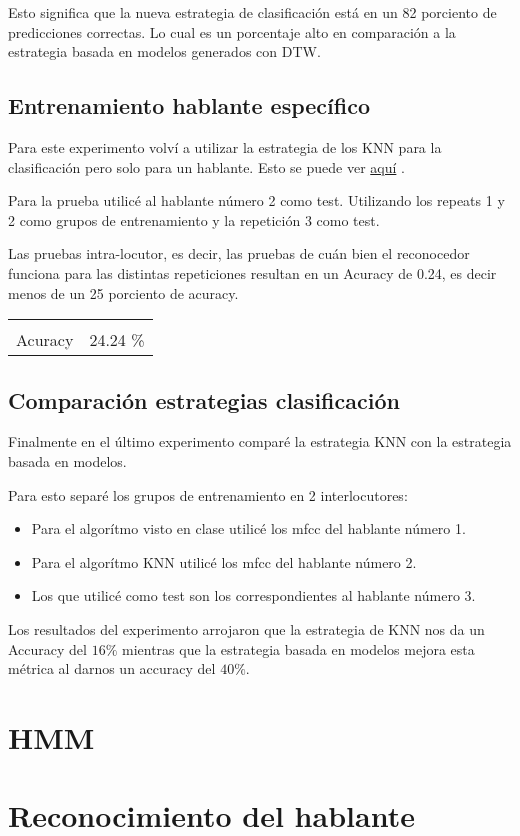 \documentclass[a4paper,8pt]{article}
\begin{document}
Esto significa que la nueva estrategia de clasificaci\'on est\'a en un 82 porciento de predicciones correctas. Lo cual es un porcentaje alto en comparaci\'on a la estrategia basada en modelos generados con DTW.


\subsection{Entrenamiento hablante espec\'ifico}

Para este experimento volv\'i a utilizar la estrategia de los KNN para la clasificaci\'on pero solo para un hablante. Esto se puede ver \href{https://github.com/dioh/asr/blob/master/punto_1/modelsTestParticular.m}{aqu\'i} .

Para la prueba utilic\'e al hablante n\'umero 2 como test. Utilizando los repeats 1 y 2 como grupos de entrenamiento y la repetici\'on 3 como test.

Las pruebas intra-locutor, es decir, las pruebas de cu\'an bien el reconocedor funciona para las distintas repeticiones resultan en un Acuracy  de 0.24, es decir menos de un 25 porciento de acuracy.

\begin{center}
    
\begin{tabular}{l|r}
    \hline \\
    Acuracy & 24.24 \%\\
\hline

\end{tabular}
    
\end{center}

\subsection{Comparaci\'on estrategias clasificaci\'on}

Finalmente en el \'ultimo experimento compar\'e la estrategia KNN con la estrategia basada en modelos.

Para esto separ\'e los grupos de entrenamiento en 2 interlocutores:

\begin{itemize}
\item Para el algor\'itmo visto en clase utilic\'e los mfcc del hablante n\'umero 1.
\item Para el algor\'itmo KNN utilic\'e los mfcc del hablante n\'umero 2.
\item Los que  utilic\'e como test son los correspondientes al hablante n\'umero 3.
\end{itemize}

Los resultados del experimento arrojaron que la estrategia de KNN nos da un Accuracy del $16\%$ mientras que la estrategia basada en modelos mejora esta m\'etrica al darnos un accuracy del $40 \%$.

\section{HMM}

\section{Reconocimiento del hablante}
\end{document}
